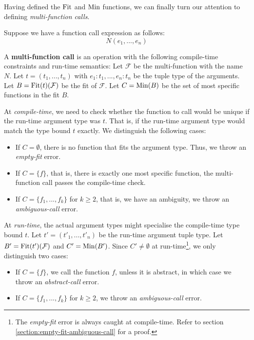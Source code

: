 \bigskip

\noindent Having defined the $\operatorname{Fit}$ and $\operatorname{Min}$ functions, we can finally turn our attention to defining \textit{multi-function calls}.

\begin{definition}
	Suppose we have a function call expression as follows:
	\begin{equation*}
		N(e_1, ..., e_n)
	\end{equation*}
	
	\noindent A \textbf{multi-function call} is an operation with the following compile-time constraints and run-time semantics: Let $\mathcal{F}$ be the multi-function with the name $N$. Let $t = (t_1, ..., t_n)$ with $e_1 : t_1, ..., e_n : t_n$ be the tuple type of the arguments. Let $B = \operatorname{Fit}(t)(\mathcal{F})$ be the fit of $\mathcal{F}$. Let $C = \operatorname{Min}(B)$ be the set of most specific functions in the fit $B$. 
	
	At \textit{compile-time}, we need to check whether the function to call would be unique if the run-time argument type was $t$. That is, if the run-time argument type would match the type bound $t$ exactly. We distinguish the following cases:
	\begin{itemize}
		\item If $C = \emptyset$, there is no function that fits the argument type. Thus, we throw an \textit{empty-fit} error.
		\item If $C = \{ f \}$, that is, there is exactly one most specific function, the multi-function call passes the compile-time check.
		\item If $C = \{ f_1, ..., f_k \}$ for $k \geq 2$, that is, we have an ambiguity, we throw an \textit{ambiguous-call} error.
	\end{itemize}
	
	\noindent At \textit{run-time}, the actual argument types might specialise the compile-time type bound $t$. Let $t' = (t'_1, ..., t'_n)$ be the run-time argument tuple type. Let $B' = \operatorname{Fit}(t')(\mathcal{F})$ and $C' = \operatorname{Min}(B')$. Since $C' \neq \emptyset$ at run-time\footnote{The \textit{empty-fit} error is always caught at compile-time. Refer to section \ref{section:empty-fit-ambiguous-call} for a proof.}, we only distinguish two cases:
	\begin{itemize}
		\item If $C = \{ f \}$, we call the function $f$, unless it is abstract, in which case we throw an \textit{abstract-call} error.
		\item If $C = \{ f_1, ..., f_k \}$ for $k \geq 2$, we throw an \textit{ambiguous-call} error.
	\end{itemize}
\end{definition}

